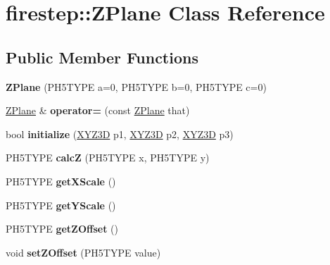 \hypertarget{classfirestep_1_1_z_plane}{\section{firestep\+:\+:Z\+Plane Class Reference}
\label{classfirestep_1_1_z_plane}
}
\subsection*{Public Member Functions}
\begin{DoxyCompactItemize}
\item 
\hypertarget{classfirestep_1_1_z_plane_a791f0547290a3fa0545a60f75adf0620}{{\bfseries Z\+Plane} (P\+H5\+T\+Y\+P\+E a=0, P\+H5\+T\+Y\+P\+E b=0, P\+H5\+T\+Y\+P\+E c=0)}\label{classfirestep_1_1_z_plane_a791f0547290a3fa0545a60f75adf0620}

\item 
\hypertarget{classfirestep_1_1_z_plane_a29fa12b27615771ce4a451cb2bb4291c}{\hyperlink{classfirestep_1_1_z_plane}{Z\+Plane} \& {\bfseries operator=} (const \hyperlink{classfirestep_1_1_z_plane}{Z\+Plane} that)}\label{classfirestep_1_1_z_plane_a29fa12b27615771ce4a451cb2bb4291c}

\item 
\hypertarget{classfirestep_1_1_z_plane_a1f78df2693f360f78e203029d7347124}{bool {\bfseries initialize} (\hyperlink{classfirestep_1_1_x_y_z3_d}{X\+Y\+Z3\+D} p1, \hyperlink{classfirestep_1_1_x_y_z3_d}{X\+Y\+Z3\+D} p2, \hyperlink{classfirestep_1_1_x_y_z3_d}{X\+Y\+Z3\+D} p3)}\label{classfirestep_1_1_z_plane_a1f78df2693f360f78e203029d7347124}

\item 
\hypertarget{classfirestep_1_1_z_plane_ac7ce8f801cad2ceb839f9ecf17002f9d}{P\+H5\+T\+Y\+P\+E {\bfseries calc\+Z} (P\+H5\+T\+Y\+P\+E x, P\+H5\+T\+Y\+P\+E y)}\label{classfirestep_1_1_z_plane_ac7ce8f801cad2ceb839f9ecf17002f9d}

\item 
\hypertarget{classfirestep_1_1_z_plane_acde7d2b1955a9f921be7618eda425ca8}{P\+H5\+T\+Y\+P\+E {\bfseries get\+X\+Scale} ()}\label{classfirestep_1_1_z_plane_acde7d2b1955a9f921be7618eda425ca8}

\item 
\hypertarget{classfirestep_1_1_z_plane_aa8fc8741e87601bbba9eeb6d1838f14c}{P\+H5\+T\+Y\+P\+E {\bfseries get\+Y\+Scale} ()}\label{classfirestep_1_1_z_plane_aa8fc8741e87601bbba9eeb6d1838f14c}

\item 
\hypertarget{classfirestep_1_1_z_plane_ac4df8b10208e79164acffdf930ffa3f3}{P\+H5\+T\+Y\+P\+E {\bfseries get\+Z\+Offset} ()}\label{classfirestep_1_1_z_plane_ac4df8b10208e79164acffdf930ffa3f3}

\item 
\hypertarget{classfirestep_1_1_z_plane_aed64c33e7a40d0c10544ad225d483c1e}{void {\bfseries set\+Z\+Offset} (P\+H5\+T\+Y\+P\+E value)}\label{classfirestep_1_1_z_plane_aed64c33e7a40d0c10544ad225d483c1e}

\end{DoxyCompactItemize}
